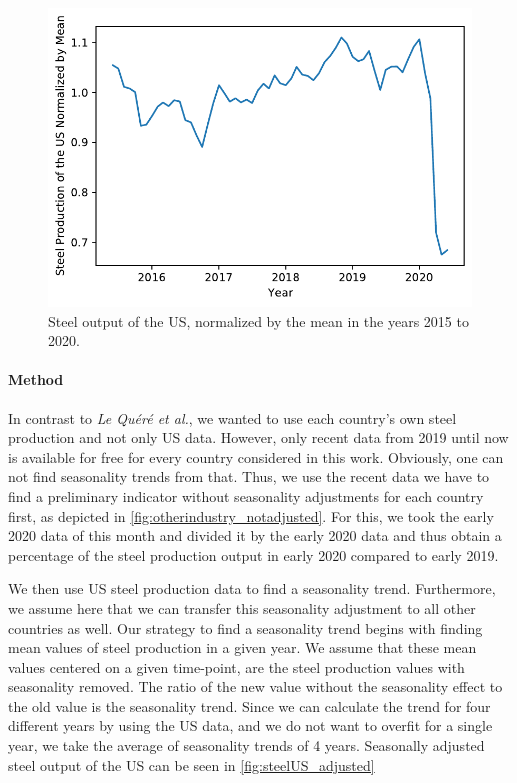 \begin{figure}[hbt]
	\centering
	\includegraphics[width=0.69\linewidth]{../predictions/steelUS.pdf}
	\caption{Steel output of the US, normalized by the mean in the years 2015 to 2020.}
	\label{fig:steelUS}
\end{figure}

\newpage

\paragraph{Method}
In contrast to \textit{Le Quéré et al.}, we wanted to use each country's own steel production and not only US data. However, only recent data from 2019 until now is available for free for every country considered in this work. Obviously, one can not find seasonality trends from that. Thus, we use the recent data we have to find a preliminary indicator without seasonality adjustments for each country first, as depicted in \autoref{fig:otherindustry_notadjusted}. For this, we took the early 2020 data of this month and divided it by the early 2020 data and thus obtain a percentage of the steel production output in early 2020 compared to early 2019. 

We then use US steel production data to find a seasonality trend. Furthermore, we assume here that we can transfer this seasonality adjustment to all other countries as well. Our strategy to find a seasonality trend begins with finding mean values of steel production in a given year. We assume that these mean values centered on a given time-point, are the steel production values with seasonality removed. The ratio of the new value without the seasonality effect to the old value is the seasonality trend. Since we can calculate the trend for four different years by using the US data, and we do not want to overfit for a single year, we take the average of seasonality trends of 4 years. Seasonally adjusted steel output of the US can be seen in \autoref{fig:steelUS_adjusted}

